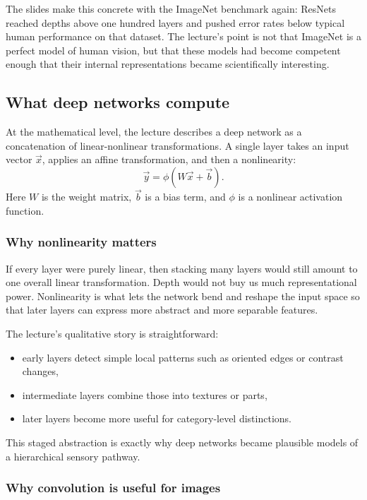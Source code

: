 The slides make this concrete with the ImageNet benchmark again: ResNets reached depths above one hundred layers and pushed error rates below typical human performance on that dataset. The lecture's point is not that ImageNet is a perfect model of human vision, but that these models had become competent enough that their internal representations became scientifically interesting.

\subsection{What deep networks compute}

At the mathematical level, the lecture describes a deep network as a concatenation of linear-nonlinear transformations. A single layer takes an input vector \(\vec{x}\), applies an affine transformation, and then a nonlinearity:
\[
\vec{y} = \phi\!\left(W\vec{x} + \vec{b}\right).
\]
Here \(W\) is the weight matrix, \(\vec{b}\) is a bias term, and \(\phi\) is a nonlinear activation function.

\subsubsection{Why nonlinearity matters}

If every layer were purely linear, then stacking many layers would still amount to one overall linear transformation. Depth would not buy us much representational power. Nonlinearity is what lets the network bend and reshape the input space so that later layers can express more abstract and more separable features.

The lecture's qualitative story is straightforward:
\begin{itemize}
    \item early layers detect simple local patterns such as oriented edges or contrast changes,
    \item intermediate layers combine those into textures or parts,
    \item later layers become more useful for category-level distinctions.
\end{itemize}

This staged abstraction is exactly why deep networks became plausible models of a hierarchical sensory pathway.

\subsubsection{Why convolution is useful for images}

